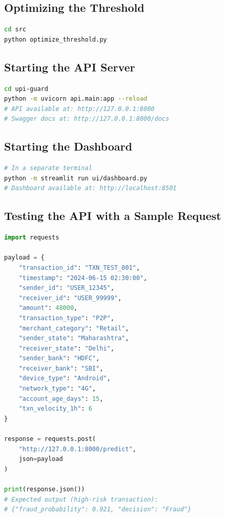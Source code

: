 \subsection{Optimizing the Threshold}

\begin{lstlisting}[language=bash, caption={Commands to optimize the threshold}]
cd src
python optimize_threshold.py
\end{lstlisting}

\subsection{Starting the API Server}

\begin{lstlisting}[language=bash, caption={Starting the FastAPI server}]
cd upi-guard
python -m uvicorn api.main:app --reload
# API available at: http://127.0.0.1:8000
# Swagger docs at: http://127.0.0.1:8000/docs
\end{lstlisting}

\subsection{Starting the Dashboard}

\begin{lstlisting}[language=bash, caption={Starting the Streamlit dashboard}]
# In a separate terminal
python -m streamlit run ui/dashboard.py
# Dashboard available at: http://localhost:8501
\end{lstlisting}

\subsection{Testing the API with a Sample Request}

\begin{lstlisting}[language=Python, caption={Sample API request using Python requests library}]
import requests

payload = {
    "transaction_id": "TXN_TEST_001",
    "timestamp": "2024-06-15 02:30:00",
    "sender_id": "USER_12345",
    "receiver_id": "USER_99999",
    "amount": 48000,
    "transaction_type": "P2P",
    "merchant_category": "Retail",
    "sender_state": "Maharashtra",
    "receiver_state": "Delhi",
    "sender_bank": "HDFC",
    "receiver_bank": "SBI",
    "device_type": "Android",
    "network_type": "4G",
    "account_age_days": 15,
    "txn_velocity_1h": 6
}

response = requests.post(
    "http://127.0.0.1:8000/predict",
    json=payload
)

print(response.json())
# Expected output (high-risk transaction):
# {"fraud_probability": 0.921, "decision": "Fraud"}
\end{lstlisting}
